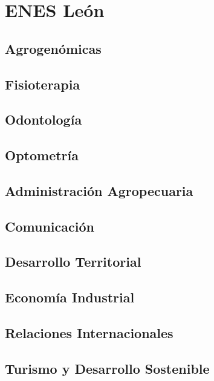 \section{ENES León}

\subsection{Agrogenómicas}

\subsection{Fisioterapia}
\sincodigo

\subsection{Odontología}

\subsection{Optometría}

\subsection{Administración Agropecuaria}

\subsection{Comunicación}
\sincodigo

\subsection{Desarrollo Territorial}

\subsection{Economía Industrial}

\subsection{Relaciones Internacionales}

\subsection{Turismo y Desarrollo Sostenible}

